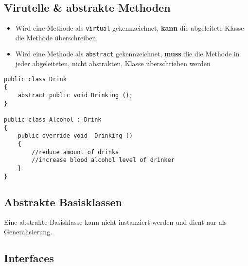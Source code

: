 \subsection{Virutelle \& abstrakte Methoden}
\begin{itemize}
\item Wird eine Methode als \texttt{virtual} gekennzeichnet, \textbf{kann} die abgeleitete Klasse die Methode überschreiben
\item Wird eine Methode als \texttt{abstract} gekennzeichnet, \textbf{muss} die die Methode in jeder abgeleiteten, nicht abstrakten, Klasse überschrieben werden
\end{itemize}
\begin{lstlisting}
public class Drink
{
	abstract public void Drinking ();
}

public class Alcohol : Drink
{
	public override void  Drinking ()
	{
		//reduce amount of drinks
		//increase blood alcohol level of drinker
	}
}
\end{lstlisting}
\subsection{Abstrakte Basisklassen}
Eine abstrakte Basisklasse kann nicht instanziert werden und dient nur als Generalisierung.
\subsection{Interfaces}



